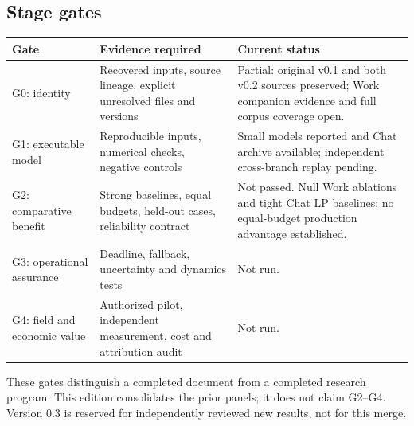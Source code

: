 \documentclass[11pt,letterpaper]{article}
\begin{document}
\subsection{Stage gates}
\begin{longtable}{P{.17\linewidth}P{.44\linewidth}P{.30\linewidth}}
\toprule Gate & Evidence required & Current status\\\midrule\endhead
G0: identity & Recovered inputs, source lineage, explicit unresolved files and versions & Partial: original v0.1 and both v0.2 sources preserved; Work companion evidence and full corpus coverage open.\\
G1: executable model & Reproducible inputs, numerical checks, negative controls & Small models reported and Chat archive available; independent cross-branch replay pending.\\
G2: comparative benefit & Strong baselines, equal budgets, held-out cases, reliability contract & Not passed. Null Work ablations and tight Chat LP baselines; no equal-budget production advantage established.\\
G3: operational assurance & Deadline, fallback, uncertainty and dynamics tests & Not run.\\
G4: field and economic value & Authorized pilot, independent measurement, cost and attribution audit & Not run.\\
\bottomrule
\end{longtable}
These gates distinguish a completed document from a completed research program. This edition consolidates the prior panels; it does not claim G2--G4. Version 0.3 is reserved for independently reviewed new results, not for this merge.
\end{document}
